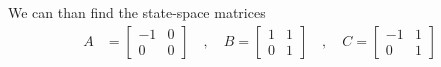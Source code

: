 \documentclass[twoside]{article}
\begin{document}
%
We can than find the state-space matrices 
%
\begin{align*}
A &= \left[ \begin{array}{ccc} -1 & 0 \\ 0 & 0  \end{array} \right]
\quad , \quad 
B = \left[ \begin{array}{cc} 1 & 1 \\  0 & 1 \end{array} \right]
\quad , \quad 
	C = \left[ \begin{array}{cc} -1  & 1
	       \\  0 &  1  \end{array} \right]
\end{align*}
% 
\end{document}
